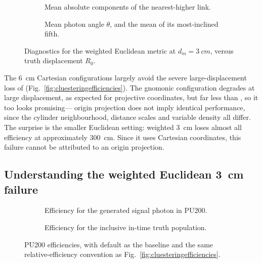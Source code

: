 \begin{figure}[!tp]
  \centering
  \begin{subfigure}{0.49\textwidth}
    \caption{Mean absolute components of the nearest-higher link.}
  \end{subfigure}\hfill
  \begin{subfigure}{0.49\textwidth}
    \caption{Mean photon angle $\theta$, and the mean of its most-inclined fifth.}
  \end{subfigure}
  \caption{Diagnostics for the weighted Euclidean metric at $d_m=\SI{3}{cm}$, versus
  truth displacement $R_0$.}
  \label{fig:cluesteringdiagnostic}
\end{figure}

The \SI{6}{cm} Cartesian configurations largely avoid the severe large-displacement
loss of \cluethreed{} (Fig.~\ref{fig:cluesteringefficiencies}). The
gnomonic configuration degrades at large displacement, as expected for
projective coordinates, but far less than \cluethreed{}, so it too looks
promising--- origin projection does not imply identical performance,
since the cylinder neighbourhood, distance scales and variable density all
differ. The surprise is the smaller Euclidean setting: weighted \SI{3}{cm} loses almost all efficiency at approximately \SI{300}{cm}.
Since it uses Cartesian coordinates, this failure cannot be attributed to an
origin projection.

\subsection{Understanding the weighted Euclidean \SI{3}{cm} failure}



\begin{figure}[!tp]
  \centering
  \begin{subfigure}{\textwidth}
    \caption{Efficiency for the generated signal photon in PU200.}
    \label{fig:cluesteringsignalpu}
  \end{subfigure}
  \par\medskip
  \begin{subfigure}{\textwidth}
    \caption{Efficiency for the inclusive in-time truth population.}
    \label{fig:cluesteringinclusive}
  \end{subfigure}
  \caption{PU200 efficiencies, with default \cluethreed{} as the baseline
  and the same relative-efficiency convention as
  Fig.~\ref{fig:cluesteringefficiencies}.}
  \label{fig:cluesteringpuefficiencies}
\end{figure}

